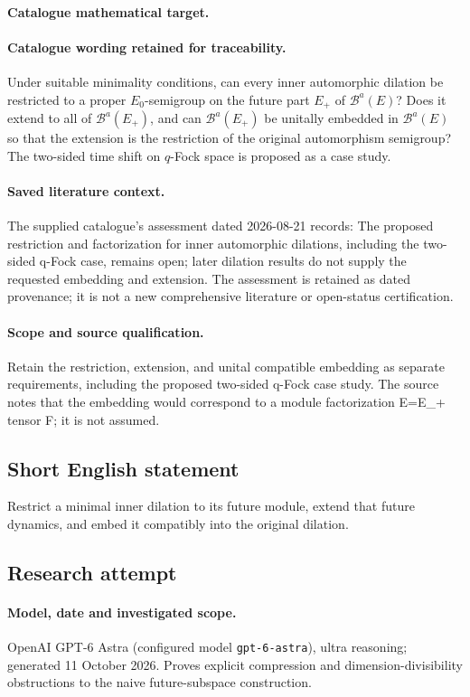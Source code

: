 \documentclass[11pt]{article}
\begin{document}
\paragraph{Catalogue mathematical target.}
\paragraph{Catalogue wording retained for traceability.}
Under suitable minimality conditions, can every inner automorphic dilation be restricted to a proper $E_0$-semigroup on the future part $E_+$ of $\mathcal B^a(E)$? Does it extend to all of $\mathcal B^a(E_+)$, and can $\mathcal B^a(E_+)$ be unitally embedded in $\mathcal B^a(E)$ so that the extension is the restriction of the original automorphism semigroup? The two-sided time shift on $q$-Fock space is proposed as a case study.

\paragraph{Saved literature context.} The supplied catalogue's assessment dated 2026-08-21 records: The proposed restriction and factorization for inner automorphic dilations, including the two-sided q-Fock case, remains open; later dilation results do not supply the requested embedding and extension. The assessment is retained as dated provenance; it is not a new comprehensive literature or open-status certification.
\paragraph{Scope and source qualification.}Retain the restriction, extension, and unital compatible embedding as separate requirements, including the proposed two-sided q-Fock case study. The source notes that the embedding would correspond to a module factorization E=E_+ tensor F; it is not assumed.
\subsection{Short English statement}
Restrict a minimal inner dilation to its future module, extend that future dynamics, and embed it compatibly into the original dilation.
\subsection{Research attempt}
\paragraph{Model, date and investigated scope.}
OpenAI GPT-6 Astra (configured model \texttt{gpt-6-astra}), ultra reasoning; generated 11 October 2026. Proves explicit compression and dimension-divisibility obstructions to the naive future-subspace construction.
\end{document}
